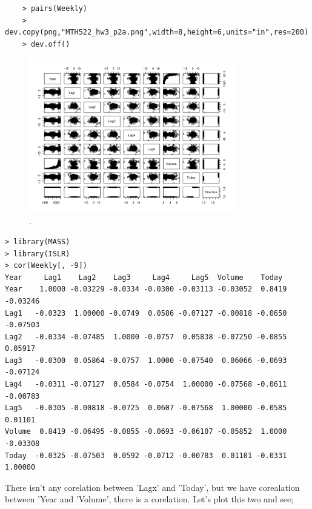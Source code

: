 \documentclass{article}
\begin{document}
\newpage

\begin{program}
	\begin{verbatim}	
	> pairs(Weekly)
	> dev.copy(png,"MTH522_hw3_p2a.png",width=8,height=6,units="in",res=200)
	> dev.off()
	\end{verbatim}
	\caption{The R code generate Figure.\ \ref{fig:MTH522_hw3_p2a}.}
\end{program}

\begin{figure}[htb]
	\begin{center}
		\includegraphics[width=0.8\textwidth]{MTH522_hw3_p2a.png}
	\end{center}
	\caption{.}
	\label{fig:MTH522_hw3_p2a}
\end{figure}

\begin{program}
\begin{verbatim}
> library(MASS)
> library(ISLR)
> cor(Weekly[, -9])
Year     Lag1    Lag2    Lag3     Lag4     Lag5  Volume    Today
Year    1.0000 -0.03229 -0.0334 -0.0300 -0.03113 -0.03052  0.8419 -0.03246
Lag1   -0.0323  1.00000 -0.0749  0.0586 -0.07127 -0.00818 -0.0650 -0.07503
Lag2   -0.0334 -0.07485  1.0000 -0.0757  0.05838 -0.07250 -0.0855  0.05917
Lag3   -0.0300  0.05864 -0.0757  1.0000 -0.07540  0.06066 -0.0693 -0.07124
Lag4   -0.0311 -0.07127  0.0584 -0.0754  1.00000 -0.07568 -0.0611 -0.00783
Lag5   -0.0305 -0.00818 -0.0725  0.0607 -0.07568  1.00000 -0.0585  0.01101
Volume  0.8419 -0.06495 -0.0855 -0.0693 -0.06107 -0.05852  1.0000 -0.03308
Today  -0.0325 -0.07503  0.0592 -0.0712 -0.00783  0.01101 -0.0331  1.00000
\end{verbatim}
\end{program}

\newpage
There isn't any corelation between 'Lagx'  and 'Today', but we have corealation between 'Year and 'Volume', there is a corelation. Let's plot this two and see;
\end{document}

